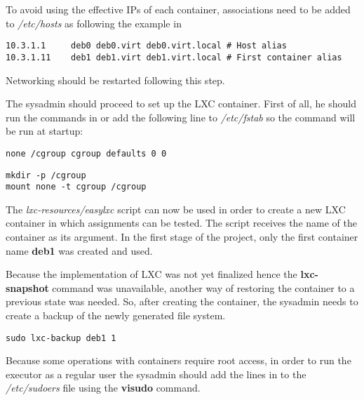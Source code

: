 To avoid using the effective IPs of each container, associations need to be 
added to \textit{/etc/hosts} as following the example in 


\lstset{caption=Host Aliases,label=lst:etc-hosts}
\begin{lstlisting}
10.3.1.1     deb0 deb0.virt deb0.virt.local # Host alias
10.3.1.11    deb1 deb1.virt deb1.virt.local # First container alias
\end{lstlisting}

Networking should be restarted following this step.

The sysadmin should proceed to set up the LXC container. First of all, he should 
run the commands in  or add the 
following line to \textit{/etc/fstab} so the command will be run at startup:
\lstset{caption=Permanent mounting of cgroup,label=lst:etc-fstab}
\begin{lstlisting}
none /cgroup cgroup defaults 0 0
\end{lstlisting}

\lstset{caption=Manually Mounting cgroup,label=lst:create-cgroup}
\begin{lstlisting}
mkdir -p /cgroup
mount none -t cgroup /cgroup
\end{lstlisting}

The \textit{lxc-resources/easylxc} script can now be used in order to create
a new LXC container in which assignments can be tested. The script receives the
name of the container as its argument. In the first stage of the project, only the
first container name \textbf{deb1} was created and used.

Because the implementation of LXC was not yet finalized hence the \textbf{lxc-snapshot}
command was unavailable, another way of restoring the container to a previous state
was needed. So, after creating the container, the sysadmin needs to create a backup
of the newly generated file system.

\lstset{caption=Creating a Backup for the File System,label=lst:create-backup}
\begin{lstlisting}
sudo lxc-backup deb1 1
\end{lstlisting}

Because some operations with containers require root access, in order to
run the executor as a regular user the sysadmin should add the lines in 
 to the \textit{/etc/sudoers} file 
using the \textbf{visudo} command.

